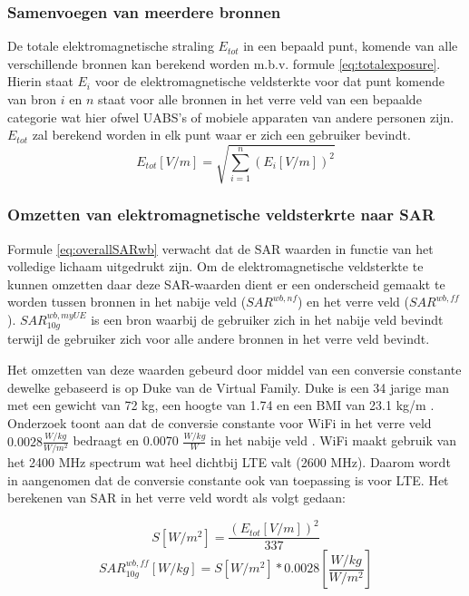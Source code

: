 \documentclass[twocolumn]{phdsymp_dutch}
\begin{document}
\subsubsection{Samenvoegen van meerdere bronnen}

De totale elektromagnetische straling $E_{tot}$ in een bepaald punt, komende van alle verschillende bronnen kan berekend worden 
m.b.v. formule \ref{eq:totalexposure}. Hierin staat $E_i$ voor de elektromagnetische veldsterkte voor dat punt komende van bron $i$
en $n$ staat voor alle bronnen in het verre veld van een bepaalde categorie wat hier ofwel \gls{UABS}'s of mobiele apparaten van andere personen zijn.
$E_{tot}$ zal berekend worden in elk punt waar er zich een gebruiker bevindt.
\begin{equation}
E_{tot} [V/m] = \sqrt{\sum_{i=1}^{n} (E_i [V/m]) ^2}
\label{eq:totalexposure}
\end{equation}

\subsubsection{Omzetten van elektromagnetische veldsterkrte naar \gls{SAR}}

Formule \ref{eq:overallSARwb}  verwacht dat de \gls{SAR} waarden in functie van het volledige lichaam uitgedrukt zijn.
Om de elektromagnetische veldsterkte te kunnen omzetten daar deze \gls{SAR}-waarden dient er een onderscheid gemaakt te worden 
tussen bronnen in het nabije veld ($SAR^{wb,nf}$) en het verre veld ($SAR^{wb,ff}$).
$SAR^{wb,myUE}_{10g}$ is een bron waarbij de gebruiker zich in het nabije veld bevindt terwijl 
de gebruiker zich voor alle andere bronnen in het verre veld bevindt.

Het omzetten van deze waarden gebeurd door middel van een conversie constante dewelke gebaseerd is op 
Duke van de Virtual Family. Duke is een 34 jarige man met een gewicht van 72 kg, een hoogte van 1.74 en 
een BMI van 23.1 kg/m \cite{J22_plets2015joint}. 
Onderzoek toont aan dat de conversie constante voor WiFi in het verre veld $0.0028 \frac{W/kg}{W/m^2}$ bedraagt
en  0.0070 $\frac{W/kg}{W}$ in het nabije veld \cite{J22_plets2015joint}.
WiFi maakt gebruik van het 2400 MHz spectrum wat heel dichtbij \gls{LTE} valt (2600 MHz). Daarom 
wordt in \cite{J22_plets2015joint} aangenomen dat de conversie  constante ook van toepassing is voor \gls{LTE}.
Het berekenen van \gls{SAR} in het verre veld  wordt als volgt gedaan:

\begin{equation}
S [W/m^2]= \frac{(E_{tot} [V/m])^2}{337}
\label{eq:flux}
\end{equation}
\begin{equation}
SAR^{wb,ff}_{10g} [W/kg]= S [W/m^2]* 0.0028 \left[\frac{W/kg}{W/m^2}\right]
\label{eq:DLconversion}
\end{equation}
\end{document}
